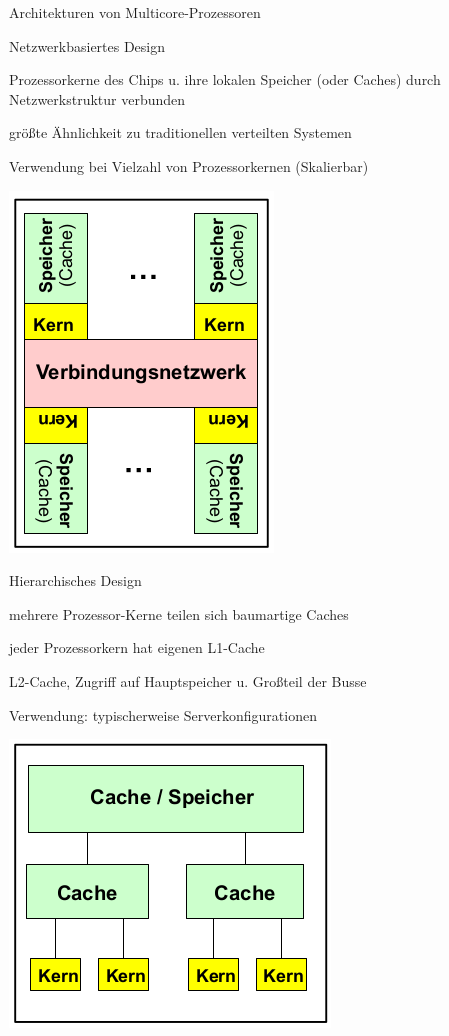 \documentclass[a4paper]{article}
\begin{document}
\begin{multicols}{3}
    Architekturen von Multicore-Prozessoren
    \begin{itemize*}
        \item Netzwerkbasiertes Design
        \begin{itemize*}
            \item Prozessorkerne des Chips u. ihre lokalen Speicher (oder Caches) durch Netzwerkstruktur verbunden
            \item größte Ähnlichkeit zu traditionellen verteilten Systemen
            \item Verwendung bei Vielzahl von Prozessorkernen (Skalierbar)
            \item \includegraphics[width=.3\linewidth]{Assets/AdvancedOperatingSystems-multicore-prozessoren.png}
        \end{itemize*}
        \item Hierarchisches Design
        \begin{itemize*}
            \item mehrere Prozessor-Kerne teilen sich baumartige Caches
            \item jeder Prozessorkern hat eigenen L1-Cache
            \item L2-Cache, Zugriff auf Hauptspeicher u. Großteil der Busse %
            \item Verwendung: typischerweise Serverkonfigurationen
            \item \includegraphics[width=.3\linewidth]{Assets/AdvancedOperatingSystems-multicore-prozessoren-2.png}

\end{itemize*}
\end{itemize*}
\end{multicols}
\end{document}
